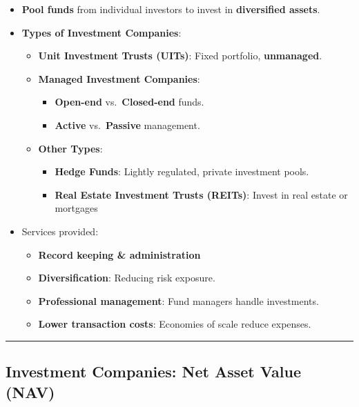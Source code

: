 \documentclass[
  letterpaper,
  DIV=11,
  numbers=noendperiod]{scrartcl}
\providecommand{\tightlist}{%
  \setlength{\itemsep}{0pt}\setlength{\parskip}{0pt}}\usepackage{longtable,booktabs,array}
\begin{document}
\begin{itemize}
\item
  \textbf{Pool funds} from individual investors to invest in
  \textbf{diversified assets}.
\item
  \textbf{Types of Investment Companies}:

  \begin{itemize}
  \tightlist
  \item
    \textbf{Unit Investment Trusts (UITs)}: Fixed portfolio,
    \textbf{unmanaged}.
  \item
    \textbf{Managed Investment Companies}:

    \begin{itemize}
    \tightlist
    \item
      \textbf{Open-end} vs.~\textbf{Closed-end} funds.
    \item
      \textbf{Active} vs.~\textbf{Passive} management.
    \end{itemize}
  \item
    \textbf{Other Types}:

    \begin{itemize}
    \tightlist
    \item
      \textbf{Hedge Funds}: Lightly regulated, private investment pools.
    \item
      \textbf{Real Estate Investment Trusts (REITs)}: Invest in real
      estate or mortgages
    \end{itemize}
  \end{itemize}
\item
  Services provided:

  \begin{itemize}
  \tightlist
  \item
    \textbf{Record keeping \& administration}
  \item
    \textbf{Diversification}: Reducing risk exposure.
  \item
    \textbf{Professional management}: Fund managers handle investments.
  \item
    \textbf{Lower transaction costs}: Economies of scale reduce
    expenses.
  \end{itemize}
\end{itemize}

\begin{center}\rule{0.5\linewidth}{0.5pt}\end{center}

\subsection{Investment Companies: Net Asset Value
(NAV)}\label{investment-companies-net-asset-value-nav}
\end{document}
